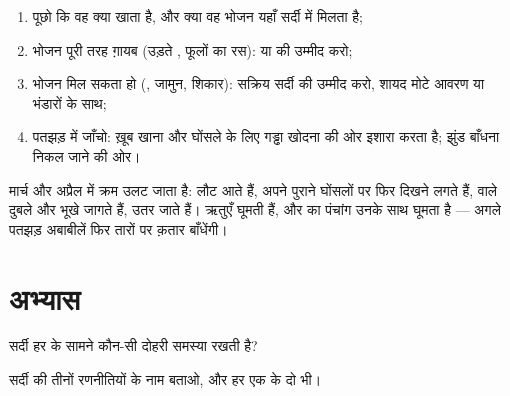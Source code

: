 \begin{method}[जंतु की सर्दी वाली रणनीति बूझना]\label{met:g3:animals-through-seasons:guess}
\begin{enumerate}
  \item पूछो कि वह क्या खाता है, और क्या वह भोजन यहाँ सर्दी में
        मिलता है;
  \item भोजन पूरी तरह ग़ायब (उड़ते , फूलों का रस):  या
         की उम्मीद करो;
  \item भोजन मिल सकता हो (, जामुन, शिकार): सक्रिय सर्दी की उम्मीद
        करो, शायद मोटे आवरण या भंडारों के साथ;
  \item पतझड़ में जाँचो: ख़ूब खाना और घोंसले के लिए गड्ढा खोदना
         की ओर इशारा करता है; झुंड बाँधना निकल जाने की ओर।
\end{enumerate}
\end{method}

\begin{example}[वसंत सब कुछ उलट देता है]\label{ex:g3:animals-through-seasons:spring}
मार्च और अप्रैल में क्रम उलट जाता है:  लौट आते हैं,  अपने
पुराने घोंसलों पर फिर दिखने लगते हैं,  वाले दुबले और भूखे
जागते हैं,  उतर जाते हैं। ऋतुएँ घूमती हैं, और  का
पंचांग उनके साथ घूमता है --- अगले पतझड़ अबाबीलें फिर तारों पर क़तार
बाँधेंगी।
\end{example}

\section{अभ्यास}

\begin{exercise}[$\star$]\label{exo:g3:animals-through-seasons:1}
सर्दी हर  के सामने कौन-सी दोहरी समस्या रखती है?
\end{exercise}

\begin{exercise}[$\star$]\label{exo:g3:animals-through-seasons:2}
सर्दी की तीनों रणनीतियों के नाम बताओ, और हर एक के दो  भी।
\end{exercise}

